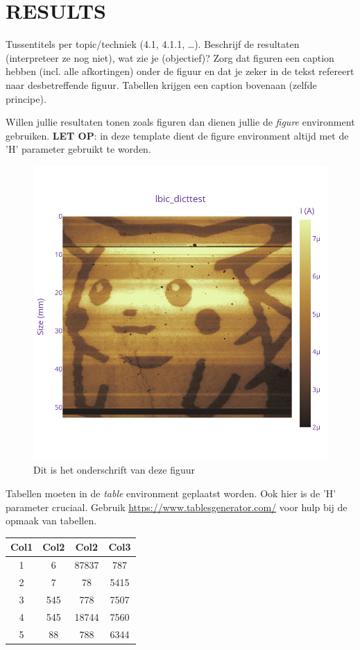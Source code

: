 \section{RESULTS}
Tussentitels per topic/techniek (4.1, 4.1.1, \dots).
Beschrijf de resultaten (interpreteer ze nog niet), wat zie je (objectief)?
Zorg dat figuren een caption hebben (incl. alle afkortingen) onder de figuur en dat je zeker in de tekst refereert naar desbetreffende figuur. 
Tabellen krijgen een caption bovenaan (zelfde principe).

Willen jullie resultaten tonen zoals figuren dan dienen jullie de \textit{figure} environment gebruiken.
\textbf{LET OP}: in deze template dient de figure environment altijd met de 'H' parameter gebruikt te worden.
\begin{figure}[H]
    \centering
    \includegraphics[width=\linewidth]{Figures/newplot(4).png}
    \caption{Dit is het onderschrift van deze figuur}
    \label{fig:pikachu}
\end{figure}

Tabellen moeten in de \textit{table} environment geplaatst worden.
Ook hier is de 'H' parameter cruciaal.
Gebruik \url{https://www.tablesgenerator.com/} voor hulp bij de opmaak van tabellen.
\begin{table}[H]
\centering
 \begin{tabular}{||c c c c||} 
 \hline
 Col1 & Col2 & Col2 & Col3 \\ [0.5ex] 
 \hline\hline
 1 & 6 & 87837 & 787 \\ 
 2 & 7 & 78 & 5415 \\
 3 & 545 & 778 & 7507 \\
 4 & 545 & 18744 & 7560 \\
 5 & 88 & 788 & 6344 \\ [1ex] 
 \hline
 \end{tabular}
\end{table}